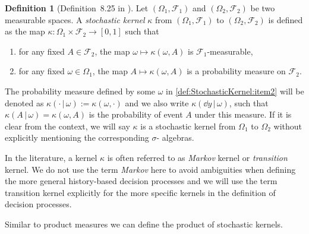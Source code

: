 \documentclass[
    a4paper,
    11pt,
    bibliography=totoc,
    listof=totoc,      
    headinclude=true,
    cleardoublepage=empty,
]{scrbook}
\theoremstyle{plain}
\theoremstyle{definition}
\newtheorem{definition}[theorem]{Definition}
\theoremstyle{remark}
\begin{document}
\begin{definition}[Definition~8.25 in \cite{klenke2020_ptcc}]
\label{def:StochasticKernel}
    Let $(\Omega_1, \mathcal{F}_1)$ and $(\Omega_2, \mathcal{F}_2)$ be two
    measurable spaces. A \textit{stochastic kernel} $\kappa$ from $(\Omega_1,
    \mathcal{F}_1)$ to $(\Omega_2, \mathcal{F}_2)$ is defined as the map
    $\kappa: \Omega_1 \times \mathcal{F}_2  \to [0,1]$
    such that
    \begin{enumerate}
        \item for any fixed $A\in\mathcal{F}_2$, the map $\omega \mapsto 
            \kappa(\omega, A)$ is $\mathcal{F}_1$-measurable,
            
        \item \label{def:StochasticKernel:item2}
            for any fixed $\omega\in\Omega_1$, the map $A \mapsto 
            \kappa(\omega, A)$ is a probability measure on $\mathcal{F}_2$.
    \end{enumerate}
    The probability measure defined by some $\omega$ in 
    \ref{def:StochasticKernel:item2} will be denoted as $\kappa(\cdot \,|\,
    \omega) := \kappa(\omega, \cdot)$ and we also write $\kappa(\dd y\,|\,
    \omega)$, such that $\kappa(A\,|\,\omega) = \kappa(\omega, A)$ is the 
    probability of event $A$ under this measure. If it is clear from the 
    context, we will say $\kappa$ is a stochastic kernel from $\Omega_1$ 
    to $\Omega_2$ without explicitly mentioning the corresponding $\sigma$-
    algebras.
\end{definition}

In the literature, a kernel $\kappa$ is often referred to as \textit{Markov} 
kernel or \textit{transition} kernel. We do not use the term \textit{Markov} 
here to avoid ambiguities when defining the more general history-based 
decision processes and we will use the term transition kernel explicitly for 
the more specific kernels in the definition of decision processes.
        
Similar to product measures we can define the product of stochastic kernels.
\end{document}
